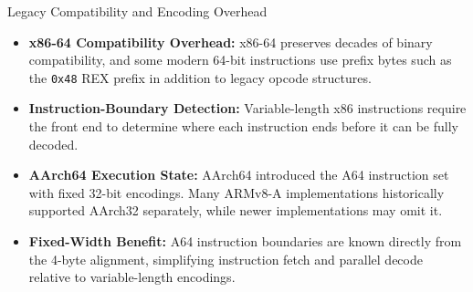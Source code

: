\documentclass[aspectratio=169,11pt,t]{beamer}
\newcommand{\key}[1]{\textbf{#1}}
\newcommand{\hex}[1]{\texttt{0x#1}}
\begin{document}
\begin{frame}{Legacy Compatibility and Encoding Overhead}
\vfill
\begin{itemize}\setlength{\itemsep}{6pt}
  \item \key{x86-64 Compatibility Overhead:} x86-64 preserves decades of binary compatibility, and some modern 64-bit instructions use prefix bytes such as the \hex{48} REX prefix in addition to legacy opcode structures.
  \item \key{Instruction-Boundary Detection:} Variable-length x86 instructions require the front end to determine where each instruction ends before it can be fully decoded.
  \item \key{AArch64 Execution State:} AArch64 introduced the A64 instruction set with fixed 32-bit encodings. Many ARMv8-A implementations historically supported AArch32 separately, while newer implementations may omit it.
  \item \key{Fixed-Width Benefit:} A64 instruction boundaries are known directly from the 4-byte alignment, simplifying instruction fetch and parallel decode relative to variable-length encodings.
\end{itemize}
\vfill
\end{frame}











\end{document}
